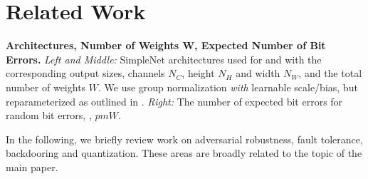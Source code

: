\section{Related Work}
\label{sec:supp-related-work}

\begin{table*}[t]
    \centering
   	\caption{\textbf{Architectures, Number of Weights $\mathbf{W}$, Expected Number of Bit Errors.} \textit{Left and Middle:} SimpleNet architectures used for \MNIST and \CifarT with the corresponding output sizes, channels $N_C$, height $N_H$ and width $N_W$, and the total number of weights $W$. We use group normalization \emph{with} learnable scale/bias, but reparameterized as outlined in . \textit{Right:} The number of expected bit errors for random bit errors, \ie, $pmW$.}
    \label{tab:supp-architectures}
    \vspace*{-0.25cm}
    \begin{subfigure}[t]{.30\textwidth}
        \vspace*{0px}
    
        
    \end{subfigure}
    \begin{subfigure}[t]{.30\textwidth}
        \vspace*{0px} 
        
        
    \end{subfigure}
    \begin{subfigure}[t]{.20\textwidth}
        \vspace*{0px}
        
        
        
        
    \end{subfigure}
    \vspace*{-0.1cm}
\end{table*}

In the following, we briefly review work on adversarial robustness, fault tolerance, backdooring and quantization. These areas are broadly related to the topic of the main paper.

